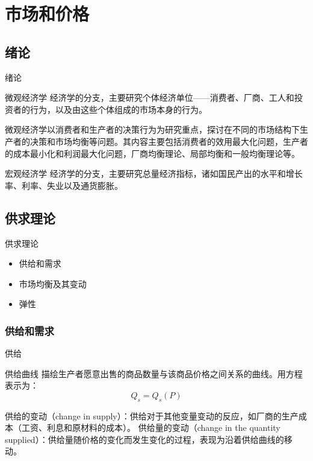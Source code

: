 \documentclass[UTF8]{ctexbeamer}
\begin{document}
\section{市场和价格}

\subsection{绪论}
\begin{frame}{绪论}
\begin{block}{微观经济学}
经济学的分支，主要研究个体经济单位——消费者、厂商、工人和投资者的行为，以及由这些个体组成的市场本身的行为。

微观经济学以消费者和生产者的决策行为为研究重点，探讨在不同的市场结构下生产者的决策和市场均衡等问题。其内容主要包括消费者的效用最大化问题，生产者的成本最小化和利润最大化问题，厂商均衡理论、局部均衡和一般均衡理论等。

\end{block}
\begin{block}{宏观经济学}
经济学的分支，主要研究总量经济指标，诸如国民产出的水平和增长率、利率、失业以及通货膨胀。
\end{block}
\end{frame}

\subsection{供求理论}
\begin{frame}{供求理论}
\linespread{1.5}
\begin{itemize}
\item 供给和需求
\item 市场均衡及其变动
\item 弹性
\end{itemize}
\end{frame}

\subsubsection{供给和需求}
\begin{frame}{供给}
\begin{block}{供给曲线}
描绘生产者愿意出售的商品数量与该商品价格之间关系的曲线。\newline 用方程表示为：
\begin{equation*}
Q_s = Q_s(P) 
\end{equation*}   
\end{block}

供给的变动（change in supply）：供给对于其他变量变动的反应，如厂商的生产成本（工资、利息和原材料的成本）。  \newline
供给量的变动（change in the quantity supplied）：供给量随价格的变化而发生变化的过程，表现为沿着供给曲线的移动。
\end{frame}
\end{document}
